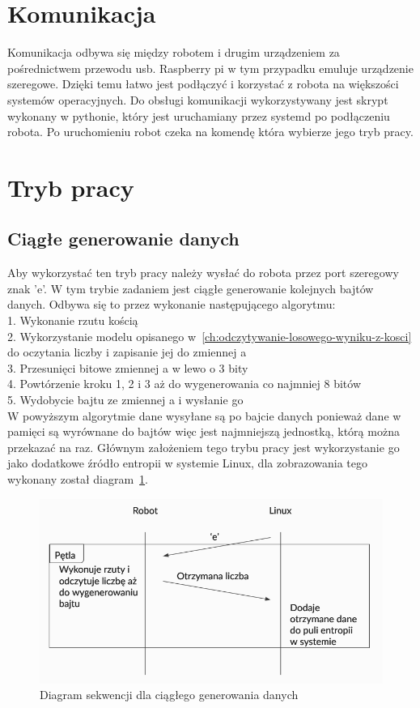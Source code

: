 \section{Komunikacja} %

Komunikacja odbywa się między robotem i drugim urządzeniem za pośrednictwem przewodu usb.
Raspberry pi w tym przypadku emuluje urządzenie szeregowe.
Dzięki temu łatwo jest podłączyć i korzystać z robota na większości systemów operacyjnych. 
Do obsługi komunikacji wykorzystywany jest skrypt wykonany w pythonie, który jest uruchamiany 
przez systemd po podłączeniu robota. Po uruchomieniu robot czeka na komendę która wybierze jego tryb pracy. 

\section{Tryb pracy} 

\subsection{Ciągłe generowanie danych}
Aby wykorzystać ten tryb pracy należy wysłać do robota przez port szeregowy znak 'e'.
W tym trybie zadaniem jest ciągłe generowanie kolejnych bajtów danych.
Odbywa się to przez wykonanie następującego algorytmu:\\
1. Wykonanie rzutu kością \\
2. Wykorzystanie modelu opisanego w~\ref{ch:odczytywanie-losowego-wyniku-z-kosci} do oczytania liczby i zapisanie jej do zmiennej a \\
3. Przesunięci bitowe zmiennej a w lewo o 3 bity \\
4. Powtórzenie kroku 1, 2 i 3 aż do wygenerowania co najmniej 8 bitów \\
5. Wydobycie bajtu ze zmiennej a i wysłanie go \\

W powyższym algorytmie dane wysyłane są po bajcie danych ponieważ dane w pamięci 
są wyrównane do bajtów więc jest najmniejszą jednostką, którą można przekazać na raz.
Głównym założeniem tego trybu pracy jest wykorzystanie go jako dodatkowe źródło entropii w systemie Linux, 
dla zobrazowania tego wykonany został diagram~\ref{fig:interface_a}.

\begin{figure}[H]
    \centering
    \includegraphics[width=0.5\linewidth]{chapters/05-Przetwarzanie Wyniku/figures/InterfaceA}
    \caption{Diagram sekwencji dla ciągłego generowania danych}
    \label{fig:interface_a}
\end{figure}

